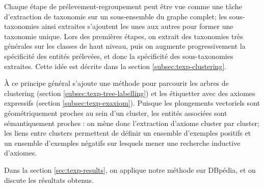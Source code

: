 Chaque étape de prélevement-regroupement peut être vue comme une tâche d'extraction de taxonomie sur un sous-ensemble du graphe complet; les sous-taxonomies ainsi extraites s'ajoutent les unes aux autres pour former une taxonomie unique. Lors des premières étapes, on extrait des taxonomies très générales sur les classes de haut niveau, puis on augmente progressivement la spécificité des entités prélevées, et donc la spécificité des sous-taxonomies extraites. Cette idée est décrite dans la section \ref{subsec:texp-clustering}.

À ce principe général s'ajoute une méthode pour parcourir les arbres de clustering (section \ref{subsec:texp-tree-labelling}) et les étiquetter avec des axiomes expressifs (section \ref{subsec:texp-exaxiom}). Puisque les plongements vectoriels sont géométriquement proches au sein d'un cluster, les entités associées sont sémantiquement proches : on mène donc l'extraction d'axiome cluster par cluster; les liens entre clusters permettent de définir un ensemble d'exemples positifs et un ensemble d'exemples négatifs sur lesquels mener une recherche inductive d'axiomes.


Dans la section \ref{sec:texp-results}, on applique notre méthode sur DBpédia, et on discute les résultats obtenus.

\iffalse {


Dans la section précédente, on a décrit une méthode pour extraire une hiérarchie entre les types à partir des seuls plongements d'entité. 

Méthode précédente : on s'interdit d'utiliser le linked data => comment retrouver l'information connue (la taxonomie DBpédia) à partir des seuls plongements vectoriels ?

Cette méthode : en utilisant toute l'information accessible, comment aller plus loin que ce qui existe (en l'occurence, trouver une taxonomie expressive – qui à l'heure actuelle n'existe pas)

Pas d'utilisation du Linked Data = méthode très descriptive, qui n'utilise pas toute l'information à notre disposition.

Schéma général proche de la méthode précédente: regroupement hiérarchique sur les entités, puis transformation de la hiérarchie entre entités en une hiérarchie sur les classes. Ici, étiquettage de la classe plus sophistiqué, puisuq'on s'autorise Linked Data.

Pourquoi ça marche ? Parce qu'on travaille sur un groupe d'entités dont on sait qu'elles sont sémantiquement proches, de par la géométrie de leurs plongements. Donc on restreint la dimension de l'espace de recherche, qui est un goulot d'étranglement habituel des méthodes d'extraction d'axiomes.

Toutefois, un ajout majeur : le retirage récursif des entités à regrouper pour limiter la propagation des erreurs dans l'arbre, limiter le bruit et affiner progressivement la spécificité des classes extraites.  %
}
\fi 

